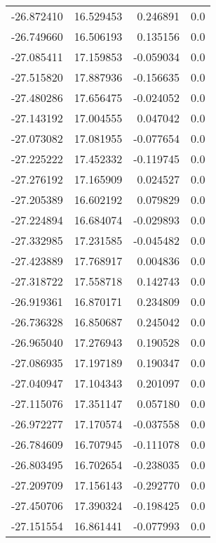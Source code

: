 \begin{tabular}{rrrr}
      -26.872410 &        16.529453 &    0.246891 &   0.0 \\
      -26.749660 &        16.506193 &    0.135156 &   0.0 \\
      -27.085411 &        17.159853 &   -0.059034 &   0.0 \\
      -27.515820 &        17.887936 &   -0.156635 &   0.0 \\
      -27.480286 &        17.656475 &   -0.024052 &   0.0 \\
      -27.143192 &        17.004555 &    0.047042 &   0.0 \\
      -27.073082 &        17.081955 &   -0.077654 &   0.0 \\
      -27.225222 &        17.452332 &   -0.119745 &   0.0 \\
      -27.276192 &        17.165909 &    0.024527 &   0.0 \\
      -27.205389 &        16.602192 &    0.079829 &   0.0 \\
      -27.224894 &        16.684074 &   -0.029893 &   0.0 \\
      -27.332985 &        17.231585 &   -0.045482 &   0.0 \\
      -27.423889 &        17.768917 &    0.004836 &   0.0 \\
      -27.318722 &        17.558718 &    0.142743 &   0.0 \\
      -26.919361 &        16.870171 &    0.234809 &   0.0 \\
      -26.736328 &        16.850687 &    0.245042 &   0.0 \\
      -26.965040 &        17.276943 &    0.190528 &   0.0 \\
      -27.086935 &        17.197189 &    0.190347 &   0.0 \\
      -27.040947 &        17.104343 &    0.201097 &   0.0 \\
      -27.115076 &        17.351147 &    0.057180 &   0.0 \\
      -26.972277 &        17.170574 &   -0.037558 &   0.0 \\
      -26.784609 &        16.707945 &   -0.111078 &   0.0 \\
      -26.803495 &        16.702654 &   -0.238035 &   0.0 \\
      -27.209709 &        17.156143 &   -0.292770 &   0.0 \\
      -27.450706 &        17.390324 &   -0.198425 &   0.0 \\
      -27.151554 &        16.861441 &   -0.077993 &   0.0 \\

\end{tabular}
